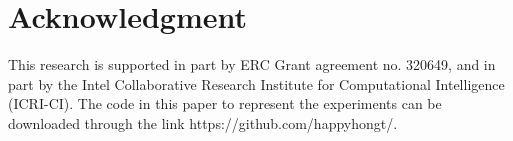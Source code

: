 \documentclass[final,5p,times,twocolumn]{elsarticle}
\begin{document}
\section*{Acknowledgment}
This research is supported in part by ERC Grant agreement no. 320649, and in part by the Intel Collaborative Research Institute for Computational Intelligence (ICRI-CI). The code
in this paper to represent the experiments can be downloaded through the link {https://github.com/happyhongt/}.

\end{document}
